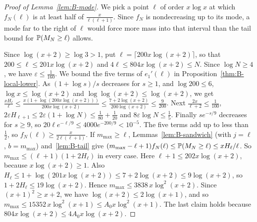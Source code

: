\begin{proof}[Proof of Lemma~\ref{lem:B-mode}]
We pick a point $\ell$ of order $x\log x$ at which $f_N(\ell)$ is at least
half of $\frac x{\ell(\ell+1)}$. Since $f_N$ is nondecreasing up to its mode, a mode far to the right of $\ell$ would force more mass into that interval than the tail bound for $\mathbb{P}(M_N\ge\ell)$ allows.

Since $\log(x+2)\ge\log3>1$, put $\ell=\lceil200x\log(x+2)\rceil$, so that $200\le\ell\le201x\log(x+2)$
and $4\ell\le804x\log(x+2)\le N$. Since $\log N\ge4$, we have $\varepsilon\le\frac1{160}$. We bound
the five terms of $e_1'(\ell)$ in Proposition~\ref{thm:B-local-lower}. As $(1+\log s)/s$
decreases for $s\ge1$, and $\log200\le6$, $\log x\le \log(x+2)$ and $\log \log(x+2)\le \log(x+2)$, we get
$\frac{xH_\ell}\ell\le\frac{x(1+\log(200x\log(x+2)))}{200x\log(x+2)}\le\frac{7+2\log(x+2)}{200\log(x+2)}\le\frac9{200}$.
Next $\frac{2x}{\ell+2}\le\frac1{100}$,
$2\varepsilon H_{\ell+1}\le2\varepsilon(1+\log N)\le\frac1{80}+\frac1{20}$ and
$8\varepsilon\log N\le\frac15$. Finally $se^{-s/9}$ decreases for $s\ge9$, so
$20\ell e^{-\ell/9}\le4000e^{-200/9}<10^{-5}$. The five terms add up to less than $\frac12$, so
$f_N(\ell)\ge\frac x{2\ell(\ell+1)}$. If $m_{\max}\ge\ell$,
Lemmas~\ref{lem:B-sandwich} (with $j=\ell$, $b=m_{\max}$) and~\ref{lem:B-tail} give
$(m_{\max}-\ell+1)f_N(\ell)\le\mathbb{P}(M_N\ge\ell)\le xH_\ell/\ell$. So
$m_{\max}\le(\ell+1)(1+2H_\ell)$ in every case. Here $\ell+1\le202x\log(x+2)$, because $x\log(x+2)\ge1$. Also
$H_\ell\le1+\log(201x\log(x+2))\le7+2\log(x+2)\le9\log(x+2)$, so $1+2H_\ell\le19\log(x+2)$. Hence
$m_{\max}\le3838\,x\log^2(x+2)$. Since $(x+1)^2\ge x+2$, we have $\log(x+2)\le2\log(x+1)$, and so
$m_{\max}\le15352\,x\log^2(x+1)\le A_0x\log^2(x+1)$. The last claim holds because
$804x\log(x+2)\le4A_0x\log(x+2)$.
\end{proof}
